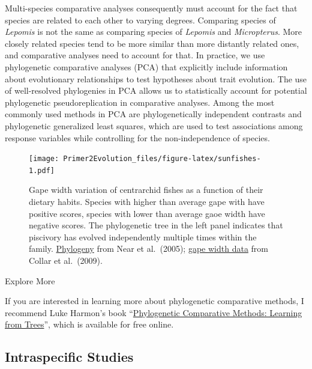 \documentclass[
]{book}
\begin{document}
Multi-species comparative analyses consequently must account for the fact that species are related to each other to varying degrees. Comparing species of \emph{Lepomis} is not the same as comparing species of \emph{Lepomis} and \emph{Micropterus}. More closely related species tend to be more similar than more distantly related ones, and comparative analyses need to account for that. In practice, we use phylogenetic comparative analyses (PCA) that explicitly include information about evolutionary relationships to test hypotheses about trait evolution. The use of well-resolved phylogenies in PCA allows us to statistically account for potential phylogenetic pseudoreplication in comparative analyses. Among the most commonly used methods in PCA are phylogenetically independent contrasts and phylogenetic generalized least squares, which are used to test associations among response variables while controlling for the non-independence of species.

\begin{figure}
\centering
\texttt{[image: Primer2Evolution\_files/figure-latex/sunfishes-1.pdf]}
\caption{\label{fig:sunfishes}Gape width variation of centrarchid fishes as a function of their dietary habits. Species with higher than average gape with have positive scores, species with lower than average gaoe width have negative scores. The phylogenetic tree in the left panel indicates that piscivory has evolved independently multiple times within the family. \href{data/9_centrarchidae.tre}{Phylogeny} from Near et al.~(2005); \href{data/9_centrarchidae.csv}{gape width data} from Collar et al.~(2009).}
\end{figure}

Explore More

If you are interested in learning more about phylogenetic comparative methods, I recommend Luke Harmon's book ``\href{https://lukejharmon.github.io/pcm/}{Phylogenetic Comparative Methods: Learning from Trees}'', which is available for free online.

\hypertarget{intraspecific-studies}{%
\subsection{Intraspecific Studies}\label{intraspecific-studies}}
\end{document}
